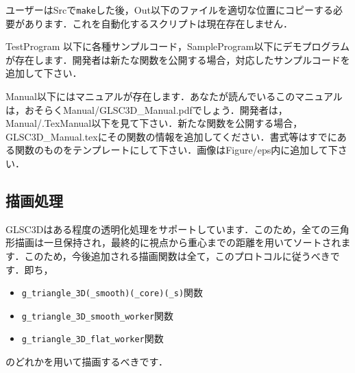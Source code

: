 \documentclass[platex,a4paper,12pt]{jsarticle}%
\begin{document}
ユーザーはSrcで\verb|make|した後，Out以下のファイルを適切な位置にコピーする必要があります．これを自動化するスクリプトは現在存在しません．

TestProgram 以下に各種サンプルコード，SampleProgram以下にデモプログラムが存在します．開発者は新たな関数を公開する場合，対応したサンプルコードを追加して下さい．

Manual以下にはマニュアルが存在します．あなたが読んでいるこのマニュアルは，おそらくManual/GLSC3D\_Manual.pdfでしょう．開発者は，Manual/.TexManual以下を見て下さい．新たな関数を公開する場合，GLSC3D\_Manual.texにその関数の情報を追加してください．書式等はすでにある関数のものをテンプレートにして下さい．画像はFigure/eps内に追加して下さい．


\subsection{描画処理}
GLSC3Dはある程度の透明化処理をサポートしています．このため，全ての三角形描画は一旦保持され，最終的に視点から重心までの距離を用いてソートされます．このため，今後追加される描画関数は全て，このプロトコルに従うべきです．即ち，

\begin{itemize}
 \item \verb|g_triangle_3D(_smooth)(_core)(_s)|関数
 \item \verb|g_triangle_3D_smooth_worker|関数
 \item \verb|g_triangle_3D_flat_worker|関数
\end{itemize}

のどれかを用いて描画するべきです．
\end{document}
